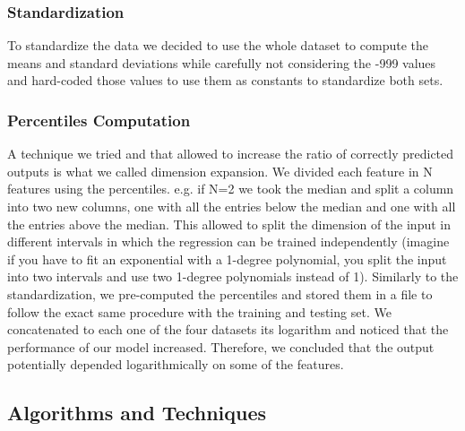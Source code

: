 \documentclass[10pt,conference,compsocconf]{IEEEtran}
\begin{document}


\subsubsection{Standardization}
To standardize the data we decided to use the whole dataset to compute the means and standard deviations while carefully not considering the -999 values and hard-coded those values to use them as constants to standardize both sets.

\subsubsection{Percentiles Computation}
A technique we tried and that allowed to increase the ratio of correctly predicted outputs is what we called dimension expansion. We divided each feature in N features using the percentiles. e.g. if N=2 we took the median and split a column into two new columns, one with all the entries below the median and one with all the entries above the median. This allowed to split the dimension of the input in different intervals in which the regression can be trained independently (imagine if you have to fit an exponential with a 1-degree polynomial, you split the input into two intervals and use two 1-degree polynomials instead of 1). Similarly to the standardization, we pre-computed the percentiles and stored them in a file to follow the exact same procedure with the training and testing set. We concatenated to each one of the four datasets its logarithm and noticed that the performance of our model increased. Therefore, we concluded that the output potentially depended logarithmically on some of the features.


\subsection{Algorithms and Techniques}
\end{document}
